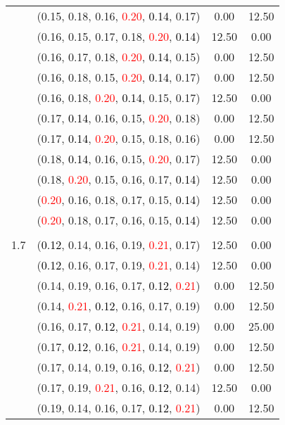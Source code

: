\documentclass[10pt,a4paper]{report}
\begin{document}
\begin{center}
\begin{longtable}{clcc}
			&(0.15, 0.18, 0.16, \textcolor{red}{0.20}, \textcolor{black}{0.14}, 0.17)&0.00&12.50\\
			&(0.16, 0.15, 0.17, 0.18, \textcolor{red}{0.20}, \textcolor{black}{0.14})&12.50&0.00\\
			&(0.16, 0.17, 0.18, \textcolor{red}{0.20}, \textcolor{black}{0.14}, 0.15)&0.00&12.50\\
			&(0.16, 0.18, 0.15, \textcolor{red}{0.20}, \textcolor{black}{0.14}, 0.17)&0.00&12.50\\
			&(0.16, 0.18, \textcolor{red}{0.20}, \textcolor{black}{0.14}, 0.15, 0.17)&12.50&0.00\\
			&(0.17, \textcolor{black}{0.14}, 0.16, 0.15, \textcolor{red}{0.20}, 0.18)&0.00&12.50\\
			&(0.17, \textcolor{black}{0.14}, \textcolor{red}{0.20}, 0.15, 0.18, 0.16)&0.00&12.50\\
			&(0.18, \textcolor{black}{0.14}, 0.16, 0.15, \textcolor{red}{0.20}, 0.17)&12.50&0.00\\
			&(0.18, \textcolor{red}{0.20}, 0.15, 0.16, 0.17, \textcolor{black}{0.14})&12.50&0.00\\
			&(\textcolor{red}{0.20}, 0.16, 0.18, 0.17, 0.15, \textcolor{black}{0.14})&12.50&0.00\\
			&(\textcolor{red}{0.20}, 0.18, 0.17, 0.16, 0.15, \textcolor{black}{0.14})&12.50&0.00\\
		&&&\\
		1.7			&(\textcolor{black}{0.12}, 0.14, 0.16, 0.19, \textcolor{red}{0.21}, 0.17)&12.50&0.00\\
			&(\textcolor{black}{0.12}, 0.16, 0.17, 0.19, \textcolor{red}{0.21}, 0.14)&12.50&0.00\\
			&(0.14, 0.19, 0.16, 0.17, \textcolor{black}{0.12}, \textcolor{red}{0.21})&0.00&12.50\\
			&(0.14, \textcolor{red}{0.21}, \textcolor{black}{0.12}, 0.16, 0.17, 0.19)&0.00&12.50\\
			&(0.16, 0.17, \textcolor{black}{0.12}, \textcolor{red}{0.21}, 0.14, 0.19)&0.00&25.00\\
			&(0.17, \textcolor{black}{0.12}, 0.16, \textcolor{red}{0.21}, 0.14, 0.19)&0.00&12.50\\
			&(0.17, 0.14, 0.19, 0.16, \textcolor{black}{0.12}, \textcolor{red}{0.21})&0.00&12.50\\
			&(0.17, 0.19, \textcolor{red}{0.21}, 0.16, \textcolor{black}{0.12}, 0.14)&12.50&0.00\\
			&(0.19, 0.14, 0.16, 0.17, \textcolor{black}{0.12}, \textcolor{red}{0.21})&0.00&12.50\\

\end{longtable}
\end{center}
\end{document}
